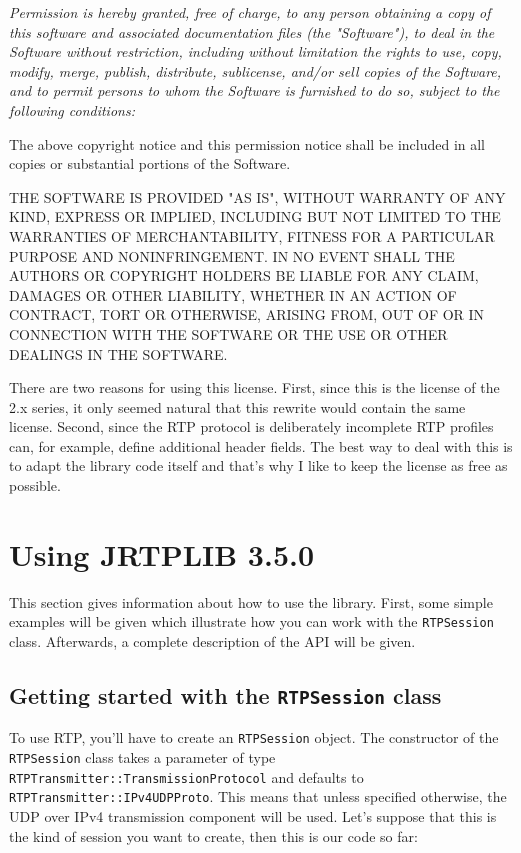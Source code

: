 \documentclass[12pt,a4paper]{article}
\newcommand{\jversion}{3.5.0}
\begin{document}
			{\em Permission is hereby granted, free of charge, to any person
			obtaining a copy of this software and associated documentation files
			(the "Software"), to deal in the Software without restriction,
			including without limitation the rights to use, copy, modify, merge,
			publish, distribute, sublicense, and/or sell copies of the Software,
			and to permit persons to whom the Software is furnished to do so,
			subject to the following conditions:

			The above copyright notice and this permission notice shall be
			included in all copies or substantial portions of the Software.

			THE SOFTWARE IS PROVIDED "AS IS", WITHOUT WARRANTY OF ANY
			KIND, EXPRESS OR IMPLIED, INCLUDING BUT NOT LIMITED TO THE
			WARRANTIES OF MERCHANTABILITY, FITNESS FOR A PARTICULAR PURPOSE AND
			NONINFRINGEMENT. IN NO EVENT SHALL THE AUTHORS OR COPYRIGHT HOLDERS
			BE LIABLE FOR ANY CLAIM, DAMAGES OR OTHER LIABILITY, WHETHER IN AN
			ACTION OF CONTRACT, TORT OR OTHERWISE, ARISING FROM, OUT OF OR IN
			CONNECTION WITH THE SOFTWARE OR THE USE OR OTHER DEALINGS IN THE
			SOFTWARE.}

		There are two reasons for using this license. First, since this is the
		license of the 2.x series, it only seemed natural that this rewrite
		would contain the same license. Second, since the RTP protocol is
		deliberately incomplete RTP profiles can, for example, define additional
		header fields. The best way to deal with this is to adapt the library
		code itself and that's why I like to keep the license as free as
		possible.

	\section{Using JRTPLIB \jversion}
		
		This section gives information about how to use the library. First, some
		simple examples will be given which illustrate how you can work with the
		{\tt RTPSession} class. Afterwards, a complete description of the API
		will be given.

		\subsection{Getting started with the {\tt RTPSession} class}

			To use RTP, you'll have to create an {\tt RTPSession} object. The
			constructor of the {\tt RTPSession} class takes a parameter of
			type {\tt RTPTrans\-mitter::Trans\-mission\-Protocol} and defaults
			to {\tt RTPTrans\-mitter::IPv4UDPProto}. This means that unless
			specified otherwise, the UDP over IPv4 transmission component will
			be used. Let's suppose that this is the kind of session you want to
			create, then this is our code so far:
\end{document}
